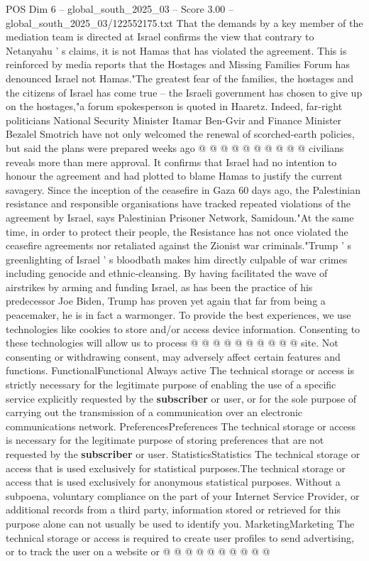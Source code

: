 \begin{textsample}{POS Dim 6 – global\_south\_2025\_03 – Score 3.00 – global\_south\_2025\_03/122552175.txt}
That the demands by a key member of the mediation team is directed at Israel confirms the view that contrary to Netanyahu ' s claims, it is not Hamas that has violated the agreement.
This is reinforced by media reports that the Hostages and Missing Families Forum has denounced Israel not Hamas."The greatest fear of the families, the hostages and the citizens of Israel has come true -- the Israeli government has chosen to give up on the hostages,"a forum spokesperson is quoted in Haaretz.
Indeed, far-right politicians National Security Minister Itamar Ben-Gvir and Finance Minister Bezalel Smotrich have not only welcomed the renewal of scorched-earth policies, but said the plans were prepared weeks ago @ @ @ @ @ @ @ @ @ @ civilians reveals more than mere approval.
It confirms that Israel had no intention to honour the agreement and had plotted to blame Hamas to justify the current savagery.
Since the inception of the ceasefire in Gaza 60 days ago, the Palestinian resistance and responsible organisations have tracked repeated violations of the agreement by Israel, says Palestinian Prisoner Network, Samidoun."At the same time, in order to protect their people, the Resistance has not once violated the ceasefire agreements nor retaliated against the Zionist war criminals."Trump ' s greenlighting of Israel ' s bloodbath makes him directly culpable of war crimes including genocide and ethnic-cleansing.
By having facilitated the wave of airstrikes by arming and funding Israel, as has been the practice of his predecessor Joe Biden, Trump has proven yet again that far from being a peacemaker, he is in fact a warmonger.
To provide the best experiences, we use technologies like cookies to store and/or access device information.
Consenting to these technologies will allow us to process @ @ @ @ @ @ @ @ @ @ site.
Not consenting or withdrawing consent, may adversely affect certain features and functions.
FunctionalFunctional Always active The technical storage or access is strictly necessary for the legitimate purpose of enabling the use of a specific service explicitly requested by the \textbf{subscriber} or user, or for the sole purpose of carrying out the transmission of a communication over an electronic communications network.
PreferencesPreferences The technical storage or access is necessary for the legitimate purpose of storing preferences that are not requested by the \textbf{subscriber} or user.
StatisticsStatistics The technical storage or access that is used exclusively for statistical purposes.The technical storage or access that is used exclusively for anonymous statistical purposes.
Without a subpoena, voluntary compliance on the part of your Internet Service Provider, or additional records from a third party, information stored or retrieved for this purpose alone can not usually be used to identify you.
MarketingMarketing The technical storage or access is required to create user profiles to send advertising, or to track the user on a website or @ @ @ @ @ @ @ @ @ @

\end{textsample}
